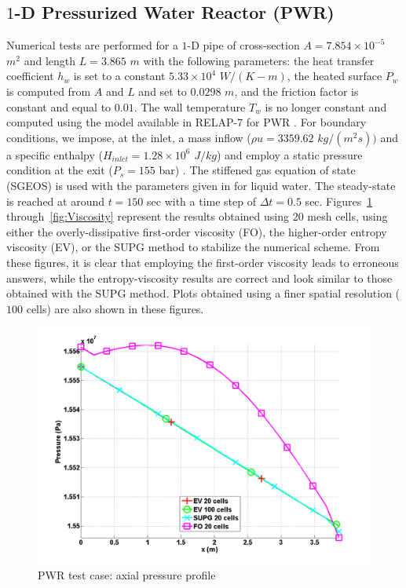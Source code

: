 \subsection{$1$-D Pressurized Water Reactor (PWR)} \label{sec:1d-pwr}
Numerical tests are performed for a $1$-D pipe of cross-section $A = 7.854 \times 10^{-5}$ $m^2$ and length $L=3.865$ $m$ with the following parameters: the heat transfer coefficient $h_w$ is set to a constant $5.33 \times 10^4$ $W/(K-m)$, the heated surface $P_w$ is computed from $A$ and $L$ and set to $0.0298$ $m$, and the friction factor is constant and equal to $0.01$. The wall temperature $T_w$ is no longer constant and computed using the model available in RELAP-7 for PWR \cite{Relap7PWR}. 
For boundary conditions, we impose, at the inlet, a mass inflow ($\rho u = 3359.62$ $kg/(m^2 s))$ and a specific enthalpy ($H_{inlet} = 1.28 \times 10^6$ $J/kg$) and employ a static pressure condition at the exit ($P_s = 155$ bar) . The stiffened gas equation of state (SGEOS) is used \cite{SGEOS} with the parameters given in  for liquid water. The steady-state is reached at around $t=150$ sec with a time step of $\Delta t = 0.5$ sec. Figures~\ref{fig:Pressure} through~\ref{fig:Viscosity} represent the results obtained using 20 mesh cells, using either the overly-dissipative first-order viscosity (FO), the higher-order entropy viscosity (EV), or the SUPG \cite{SUPG} method to stabilize the numerical scheme. From these figures, it is clear that employing the first-order viscosity leads to erroneous answers, while the entropy-viscosity results are correct and look similar to those obtained with the SUPG method. Plots obtained using a finer spatial resolution ($100$ cells) are also shown in these figures.
%
\begin{figure}[H]
\centering
\includegraphics[width=\textwidth]{figures/PWR_stt_pressure.png}
\caption{PWR test case: axial pressure profile}
\label{fig:Pressure}
\end{figure}
